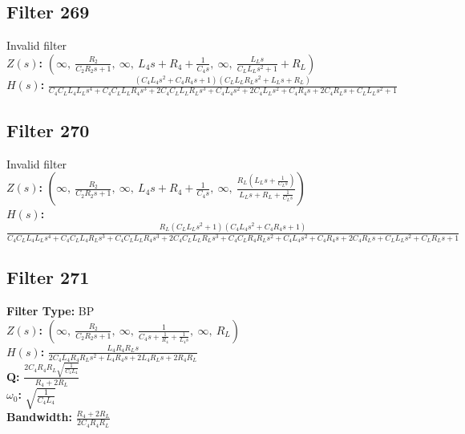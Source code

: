 \documentclass{article}
\begin{document}
\subsection*{Filter 269}
Invalid filter \\ 
\textbf{$Z(s)$:} $\left( \infty, \  \frac{R_{2}}{C_{2} R_{2} s + 1}, \  \infty, \  L_{4} s + R_{4} + \frac{1}{C_{4} s}, \  \infty, \  \frac{L_{L} s}{C_{L} L_{L} s^{2} + 1} + R_{L}\right)$ \\ 
\textbf{$H(s)$:} $\frac{\left(C_{4} L_{4} s^{2} + C_{4} R_{4} s + 1\right) \left(C_{L} L_{L} R_{L} s^{2} + L_{L} s + R_{L}\right)}{C_{4} C_{L} L_{4} L_{L} s^{4} + C_{4} C_{L} L_{L} R_{4} s^{3} + 2 C_{4} C_{L} L_{L} R_{L} s^{3} + C_{4} L_{4} s^{2} + 2 C_{4} L_{L} s^{2} + C_{4} R_{4} s + 2 C_{4} R_{L} s + C_{L} L_{L} s^{2} + 1}$ \\ 
\subsection*{Filter 270}
Invalid filter \\ 
\textbf{$Z(s)$:} $\left( \infty, \  \frac{R_{2}}{C_{2} R_{2} s + 1}, \  \infty, \  L_{4} s + R_{4} + \frac{1}{C_{4} s}, \  \infty, \  \frac{R_{L} \left(L_{L} s + \frac{1}{C_{L} s}\right)}{L_{L} s + R_{L} + \frac{1}{C_{L} s}}\right)$ \\ 
\textbf{$H(s)$:} $\frac{R_{L} \left(C_{L} L_{L} s^{2} + 1\right) \left(C_{4} L_{4} s^{2} + C_{4} R_{4} s + 1\right)}{C_{4} C_{L} L_{4} L_{L} s^{4} + C_{4} C_{L} L_{4} R_{L} s^{3} + C_{4} C_{L} L_{L} R_{4} s^{3} + 2 C_{4} C_{L} L_{L} R_{L} s^{3} + C_{4} C_{L} R_{4} R_{L} s^{2} + C_{4} L_{4} s^{2} + C_{4} R_{4} s + 2 C_{4} R_{L} s + C_{L} L_{L} s^{2} + C_{L} R_{L} s + 1}$ \\ 
\subsection*{Filter 271}
\textbf{Filter Type:} BP \\ 
\textbf{$Z(s)$:} $\left( \infty, \  \frac{R_{2}}{C_{2} R_{2} s + 1}, \  \infty, \  \frac{1}{C_{4} s + \frac{1}{R_{4}} + \frac{1}{L_{4} s}}, \  \infty, \  R_{L}\right)$ \\ 
\textbf{$H(s)$:} $\frac{L_{4} R_{4} R_{L} s}{2 C_{4} L_{4} R_{4} R_{L} s^{2} + L_{4} R_{4} s + 2 L_{4} R_{L} s + 2 R_{4} R_{L}}$ \\ 
\textbf{Q:} $\frac{2 C_{4} R_{4} R_{L} \sqrt{\frac{1}{C_{4} L_{4}}}}{R_{4} + 2 R_{L}}$ \\ 
\textbf{$\omega_0$:} $\sqrt{\frac{1}{C_{4} L_{4}}}$ \\ 
\textbf{Bandwidth:} $\frac{R_{4} + 2 R_{L}}{2 C_{4} R_{4} R_{L}}$ \\ 
\end{document}
